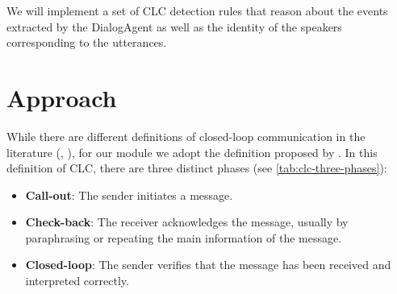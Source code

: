 We will implement a set of CLC detection rules that reason about the events
extracted by the DialogAgent as well as the identity of the speakers
corresponding to the utterances.


\section{Approach}

While there are different definitions of closed-loop communication in the
literature (\citet{abd2018closed}, \citet{yee2017role}), for our module we adopt the definition proposed by
\citet{Hargestam.ea:2013}.  In this definition of CLC, there are three distinct
phases (see \autoref{tab:clc-three-phases}): 

\begin{itemize}

    \item \textbf{Call-out}: The sender initiates a message.

    \item \textbf{Check-back}: The receiver acknowledges the message, usually
        by paraphrasing or repeating the main information of the message.

    \item \textbf{Closed-loop}: The sender verifies that the message has been
                received and interpreted correctly.

\end{itemize}

\newcommand{\utteranceone}{\textit{This is Green. I’m finishing this side, blue, could you check the central for victims? }} 
\newcommand{\utterancetwo}{\textit{This is Blue. Okay. I’ll go check the central for victims.}}
\newcommand{\utterancethree}{\textit{All right, thank you, Blue.}}

